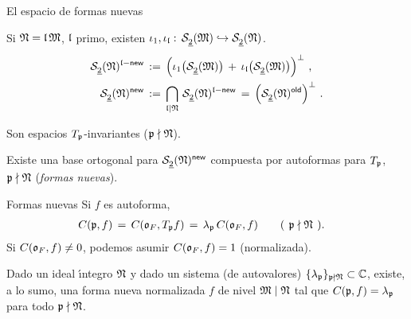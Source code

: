 \begin{frame}{El espacio de formas nuevas}
	\begin{defFormasNuevas}\label{def:formasnuevas}
		Si $\frak N=\frak l\,\frak M$, $\frak l$ primo, existen
		\begin{math}
			\iota_1,\iota_\frak{l}:\,\spitzH{2}{\frak{M}}
				\hookrightarrow\spitzH{2}{\frak{N}}
		\end{math}.
		\begin{align*}
			\spitzH2{\frak N}^{\frak l-\neue} & \,:=\,
				\Big(
				\iota_1\big(\spitzH2{\frak M}\big)\,+\,
				\iota_\frak{l}\big(\spitzH2{\frak M}\big)
					\Big)^\perp
				\text{ ,} \\
			\spitzH2{\frak N}^\neue & \,:=\,
				\bigcap_{\frak l\mid\frak N}\,
					\spitzH2{\frak N}^{\frak l-\neue}\,=\,
				\Big(\spitzH2{\frak N}^\oude\Big)^\perp
			\text{ .}
		\end{align*}
	\end{defFormasNuevas}
	Son espacios $T_{\frak p}$-invariantes ($\frak p\nmid\frak N$).
	\begin{coroBaseFormasNuevas}\label{coro:baseformasnuevas}
		Existe una base ortogonal para $\spitzH2{\frak N}^\neue$
		compuesta por autoformas para $T_{\frak p}$,
		$\frak p\nmid\frak N$ (\emph{formas nuevas}).
	\end{coroBaseFormasNuevas}
\end{frame}

\begin{frame}{Formas nuevas}
	Si $f$ es autoforma,
	\begin{align*}
		C(\frak p,f) & \,=\,C(\oka F,T_{\frak p}f)\,=\,
			\lambda_{\frak p}\,C(\oka F,f)
			\qquad\text{(\phantom)}\frak p\nmid\frak N
			\text{\phantom().}
	\end{align*}
	Si $C(\oka F,f)\not=0$, podemos asumir $C(\oka F,f)=1$ (normalizada).

	\begin{teoMultUno}\label{coro:multuno}
		Dado un ideal \'{\i}ntegro $\frak N$ y dado un sistema (de
		autovalores)
		\begin{math}
			\{\lambda_{\frak p}\}_{\frak p\nmid\frak N}\subset
				\bb{C}
		\end{math}, existe, a lo sumo, una forma nueva normalizada $f$
		de nivel $\frak M\mid\frak N$ tal que
		$C(\frak p,f)=\lambda_{\frak p}$ para todo
		$\frak p\nmid\frak N$.
	\end{teoMultUno}
\end{frame}


